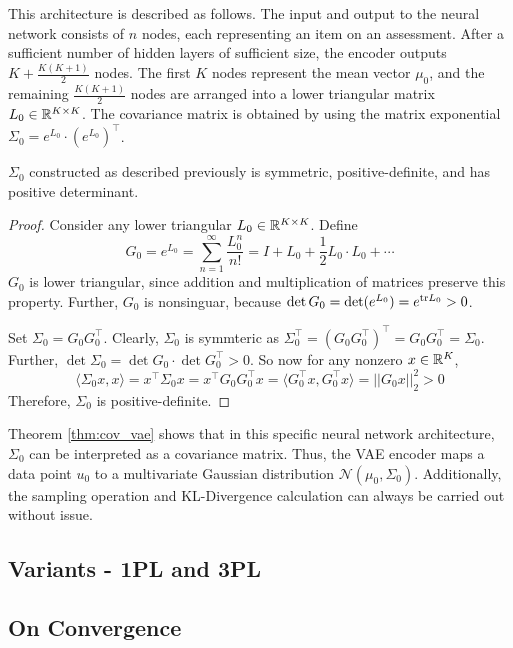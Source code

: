This architecture is described as follows. The input and output to the neural network consists of $n$ nodes, each representing an item on an assessment. After a sufficient number of hidden layers of sufficient size, the encoder outputs $K + \frac{K(K+1)}{2}$ nodes. The first $K$ nodes represent the mean vector $\mu_0$, and the remaining $\frac{K(K+1)}{2}$ nodes are arranged into a lower triangular matrix $L_0 \in \mathbb{R}^{K\times K}$. The covariance matrix is obtained by using the matrix exponential $\Sigma_0 = e^{L_0} \cdot \left( e^{L_0} \right)^\top$.

\begin{theorem}
  $\Sigma_0$ constructed as described previously is symmetric, positive-definite, and has positive determinant.
  \label{thm:cov_vae}
\end{theorem}
\begin{proof}
  Consider any lower triangular $L_0 \in \mathbb{R}^{K\times K}$. Define 
  \[G_0 = e^{L_0} = \sum_{n=1}^\infty \frac{L_0^n}{n!} = I + L_0 + \frac{1}{2} L_0 \cdot L_0 + \cdots\]
  $G_0$ is lower triangular, since addition and multiplication of matrices preserve this property. Further, $G_0$ is nonsinguar, because $\det G_0 = \det(e^{L_0}) = e^{\text{tr} L_0} > 0$.

  Set $\Sigma_0 = G_0 G_0^\top$. Clearly, $\Sigma_0$ is symmteric as $\Sigma_0^\top = (G_0 G_0^\top)^\top = G_0 G_0^\top = \Sigma_0$. Further, $\det \Sigma_0 = \det G_0 \cdot \det G_0^\top > 0$. So now for any nonzero $x \in \mathbb{R}^K$,
  \[\langle \Sigma_0 x, x \rangle = x^\top \Sigma_0 x = x^\top G_0 G_0^\top x = \langle G_0^\top x, G_0^\top x \rangle = ||G_0 x||_2^2 > 0\]
  Therefore, $\Sigma_0$ is positive-definite.
\end{proof}

Theorem \ref{thm:cov_vae} shows that in this specific neural network architecture, $\Sigma_0$ can be interpreted as a covariance matrix. Thus, the VAE encoder maps a data point $u_0$ to a multivariate Gaussian distribution $\mathcal{N}(\mu_0, \Sigma_0)$. Additionally, the sampling operation and KL-Divergence calculation can always be carried out without issue. 


\subsection{Variants - 1PL and 3PL}

\subsection{On Convergence}

